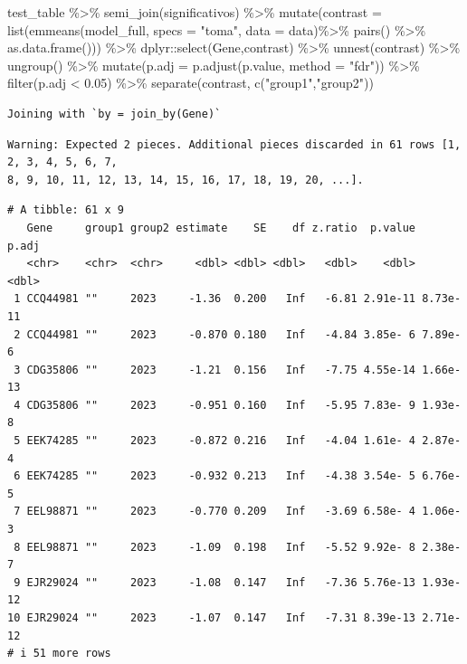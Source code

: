 \documentclass[
  letterpaper,
  DIV=11,
  numbers=noendperiod]{scrartcl}
\newenvironment{Shaded}{\begin{snugshade}}{\end{snugshade}}
\newcommand{\AttributeTok}[1]{\textcolor[rgb]{0.40,0.45,0.13}{#1}}
\newcommand{\FloatTok}[1]{\textcolor[rgb]{0.68,0.00,0.00}{#1}}
\newcommand{\FunctionTok}[1]{\textcolor[rgb]{0.28,0.35,0.67}{#1}}
\newcommand{\NormalTok}[1]{\textcolor[rgb]{0.00,0.23,0.31}{#1}}
\newcommand{\SpecialCharTok}[1]{\textcolor[rgb]{0.37,0.37,0.37}{#1}}
\newcommand{\StringTok}[1]{\textcolor[rgb]{0.13,0.47,0.30}{#1}}
\begin{document}
\begin{Shaded}
\begin{Highlighting}[]
\NormalTok{test\_table }\SpecialCharTok{\%\textgreater{}\%} 
  \FunctionTok{semi\_join}\NormalTok{(significativos) }\SpecialCharTok{\%\textgreater{}\%}  
  \FunctionTok{mutate}\NormalTok{(}\AttributeTok{contrast =} \FunctionTok{list}\NormalTok{(}\FunctionTok{emmeans}\NormalTok{(model\_full, }
                                 \AttributeTok{specs =} \StringTok{"toma"}\NormalTok{, }
                                 \AttributeTok{data =}\NormalTok{ data)}\SpecialCharTok{\%\textgreater{}\%} 
                       \FunctionTok{pairs}\NormalTok{() }\SpecialCharTok{\%\textgreater{}\%} 
                       \FunctionTok{as.data.frame}\NormalTok{())) }\SpecialCharTok{\%\textgreater{}\%} 
\NormalTok{  dplyr}\SpecialCharTok{::}\FunctionTok{select}\NormalTok{(Gene,contrast) }\SpecialCharTok{\%\textgreater{}\%} 
  \FunctionTok{unnest}\NormalTok{(contrast) }\SpecialCharTok{\%\textgreater{}\%} 
  \FunctionTok{ungroup}\NormalTok{() }\SpecialCharTok{\%\textgreater{}\%} 
  \FunctionTok{mutate}\NormalTok{(}\AttributeTok{p.adj =} \FunctionTok{p.adjust}\NormalTok{(p.value, }\AttributeTok{method =} \StringTok{"fdr"}\NormalTok{)) }\SpecialCharTok{\%\textgreater{}\%}
  \FunctionTok{filter}\NormalTok{(p.adj }\SpecialCharTok{\textless{}} \FloatTok{0.05}\NormalTok{) }\SpecialCharTok{\%\textgreater{}\%} 
  \FunctionTok{separate}\NormalTok{(contrast, }\FunctionTok{c}\NormalTok{(}\StringTok{"group1"}\NormalTok{,}\StringTok{"group2"}\NormalTok{)) }
\end{Highlighting}
\end{Shaded}

\begin{verbatim}
Joining with `by = join_by(Gene)`
\end{verbatim}

\begin{verbatim}
Warning: Expected 2 pieces. Additional pieces discarded in 61 rows [1, 2, 3, 4, 5, 6, 7,
8, 9, 10, 11, 12, 13, 14, 15, 16, 17, 18, 19, 20, ...].
\end{verbatim}

\begin{verbatim}
# A tibble: 61 x 9
   Gene     group1 group2 estimate    SE    df z.ratio  p.value    p.adj
   <chr>    <chr>  <chr>     <dbl> <dbl> <dbl>   <dbl>    <dbl>    <dbl>
 1 CCQ44981 ""     2023     -1.36  0.200   Inf   -6.81 2.91e-11 8.73e-11
 2 CCQ44981 ""     2023     -0.870 0.180   Inf   -4.84 3.85e- 6 7.89e- 6
 3 CDG35806 ""     2023     -1.21  0.156   Inf   -7.75 4.55e-14 1.66e-13
 4 CDG35806 ""     2023     -0.951 0.160   Inf   -5.95 7.83e- 9 1.93e- 8
 5 EEK74285 ""     2023     -0.872 0.216   Inf   -4.04 1.61e- 4 2.87e- 4
 6 EEK74285 ""     2023     -0.932 0.213   Inf   -4.38 3.54e- 5 6.76e- 5
 7 EEL98871 ""     2023     -0.770 0.209   Inf   -3.69 6.58e- 4 1.06e- 3
 8 EEL98871 ""     2023     -1.09  0.198   Inf   -5.52 9.92e- 8 2.38e- 7
 9 EJR29024 ""     2023     -1.08  0.147   Inf   -7.36 5.76e-13 1.93e-12
10 EJR29024 ""     2023     -1.07  0.147   Inf   -7.31 8.39e-13 2.71e-12
# i 51 more rows
\end{verbatim}
\end{document}
